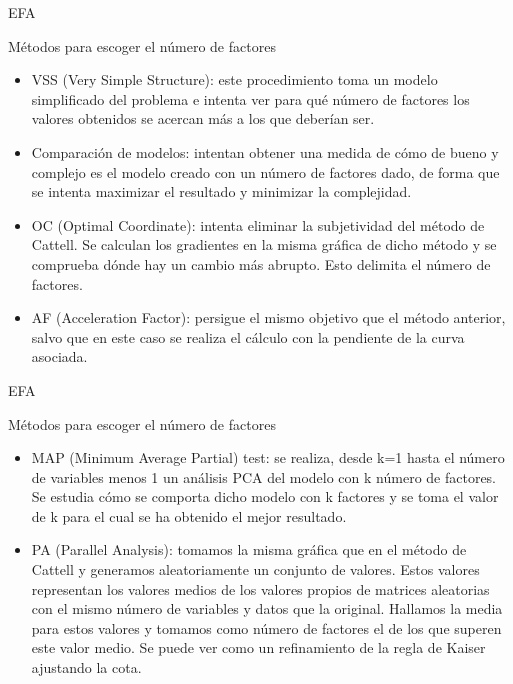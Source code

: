 \documentclass[10pt]{beamer}
\begin{document}
\begin{frame}[fragile]{EFA}
\vspace{10px}
\pause
{}
\begin{block}{Métodos para escoger el número de factores}
	\begin{itemize}
		\item VSS (Very Simple Structure): este procedimiento toma un modelo simplificado del problema e intenta ver para qué número de factores los valores obtenidos se acercan más a los que deberían ser.
		\item Comparación de modelos: intentan obtener una medida de cómo de bueno y complejo es el modelo creado con un número de factores dado, de forma que se intenta maximizar el resultado y minimizar la complejidad.
		\item OC (Optimal Coordinate): intenta eliminar la subjetividad del método de Cattell. Se calculan los gradientes en la misma gráfica de dicho método y se comprueba dónde hay un cambio más abrupto. Esto delimita el número de factores.
		\item AF (Acceleration Factor): persigue el mismo objetivo que el método anterior, salvo que en este caso se realiza el cálculo con la pendiente de la curva asociada.
	\end{itemize}
\end{block}
\end{frame}

\begin{frame}[fragile]{EFA}
\vspace{10px}
\pause
{}
\begin{block}{Métodos para escoger el número de factores}
	\begin{itemize}
		\item MAP (Minimum Average Partial) test: se realiza, desde k=1 hasta el número de variables menos 1 un análisis PCA del modelo con k número de factores. Se estudia cómo se comporta dicho modelo con k factores y se toma el valor de k para el cual se ha obtenido el mejor resultado.
		\item PA (Parallel Analysis): tomamos la misma gráfica que en el método de Cattell y generamos aleatoriamente un conjunto de valores. Estos valores representan los valores medios de los valores propios de matrices aleatorias con el mismo número de variables y datos que la original. Hallamos la media para estos valores y tomamos como número de factores el de los que superen este valor medio. Se puede ver como un refinamiento de la regla de Kaiser ajustando la cota.
	\end{itemize}
\end{block}
\end{frame}
\end{document}

